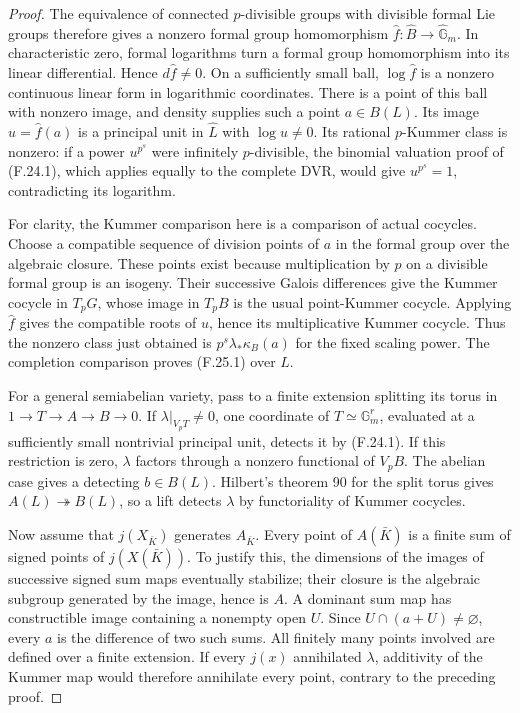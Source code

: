 \documentclass[11pt]{article}
\begin{document}
\begin{proof}
The equivalence of connected \(p\)-divisible groups with
divisible formal Lie groups
\citep[Section~2.2, Proposition~1]{FF_Tate1967} therefore
gives a nonzero formal group homomorphism
\(\widehat f:\widehat B\to\widehat{\mathbb G}_m\).
In characteristic zero, formal logarithms turn a formal
group homomorphism into its linear differential. Hence
\(d\widehat f\ne0\). On a sufficiently small ball,
\(\log\widehat f\) is a nonzero continuous linear form
in logarithmic coordinates. There is a point of this ball
with nonzero image, and density supplies such a point
\(a\in B(L)\). Its image \(u=\widehat f(a)\) is a
principal unit in \(\widehat L\) with \(\log u\ne0\).
Its rational \(p\)-Kummer class is nonzero: if a power
\(u^{p^s}\) were infinitely \(p\)-divisible, the binomial
valuation proof of (F.24.1), which applies equally to
the complete DVR, would give \(u^{p^s}=1\), contradicting
its logarithm.

For clarity, the Kummer comparison here is a comparison of
actual cocycles. Choose a compatible sequence of division
points of \(a\) in the formal group over the algebraic
closure. These points exist because multiplication by
\(p\) on a divisible formal group is an isogeny. Their
successive Galois differences give the Kummer cocycle
in \(T_pG\), whose image in \(T_pB\) is the usual
point-Kummer cocycle. Applying \(\widehat f\) gives
the compatible roots of \(u\), hence its multiplicative
Kummer cocycle. Thus the nonzero class just obtained is
\(p^s\lambda_*\kappa_B(a)\) for the fixed scaling power.
The completion comparison proves (F.25.1) over \(L\).

For a general semiabelian variety, pass to a finite
extension splitting its torus in
\(1\to T\to A\to B\to0\). If \(\lambda|_{V_pT}\ne0\),
one coordinate of \(T\simeq\mathbb G_m^r\), evaluated
at a sufficiently small nontrivial principal unit, detects
it by (F.24.1). If this restriction is zero, \(\lambda\)
factors through a nonzero functional of \(V_pB\).
The abelian case gives a detecting \(b\in B(L)\).
Hilbert's theorem 90 for the split torus gives
\(A(L)\twoheadrightarrow B(L)\), so a lift detects
\(\lambda\) by functoriality of Kummer cocycles.

Now assume that \(j(X_{\bar K})\) generates \(A_{\bar K}\).
Every point of \(A(\bar K)\) is a finite sum of signed
points of \(j(X(\bar K))\). To justify this, the dimensions
of the images of successive signed sum maps eventually
stabilize; their closure is the algebraic subgroup
generated by the image, hence is \(A\). A dominant sum
map has constructible image containing a nonempty open
\(U\). Since \(U\cap(a+U)\ne\varnothing\), every
\(a\) is the difference of two such sums. All finitely
many points involved are defined over a finite extension.
If every \(j(x)\) annihilated \(\lambda\), additivity
of the Kummer map would therefore annihilate every
point, contrary to the preceding proof.


\end{proof}
\end{document}
